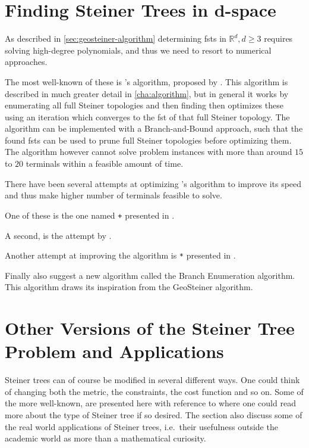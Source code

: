 \section{Finding Steiner Trees in d-space}
\label{sec:find-stein-trees-d}

As described in \cref{sec:geosteiner-algorithm} determining \acp{fst} in
$\mathbb{R}^d, d \ge 3$ requires solving high-degree polynomials, and thus we
need to resort to numerical approaches.

The most well-known of these is \citeauthor{smith1992}'s algorithm, proposed by
\textcite{smith1992}. This algorithm is described in much greater detail in
\cref{cha:algorithm}, but in general it works by enumerating all full Steiner
topologies and then finding then optimizes these using an iteration which
converges to the \ac{fst} of that full Steiner topology. The algorithm can be
implemented with a Branch-and-Bound approach, such that the found \acp{fst} can
be used to prune full Steiner topologies before optimizing them. The algorithm
however cannot solve problem instances with more than around $15$ to $20$
terminals within a feasible amount of time.

There have been several attempts at optimizing \citeauthor{smith1992}'s
algorithm to improve its speed and thus make higher number of terminals feasible
to solve.

One of these is the one named \citeauthor{smith1992}\texttt{+} presented in
\textcite{fampa2008}.

A second, is the attempt by \textcite{vanlaarhoven2013}.

Another attempt at improving the algorithm is \citeauthor{smith1992}\texttt{*}
presented in \textcite{fonseca2014}.

Finally \textcite{fonseca2014} also suggest a new algorithm called the Branch
Enumeration algorithm. This algorithm draws its inspiration from the GeoSteiner
algorithm.


\section{Other Versions of the Steiner Tree Problem and Applications}
\label{sec:other-vers-stein}

Steiner trees can of course be modified in several different ways. One could
think of changing both the metric, the constraints, the cost function and so
on. Some of the more well-known, are presented here with reference to where one
could read more about the type of Steiner tree if so desired. The section also
discuss some of the real world applications of Steiner trees, i.e.\ their
usefulness outside the academic world as more than a mathematical curiosity.

